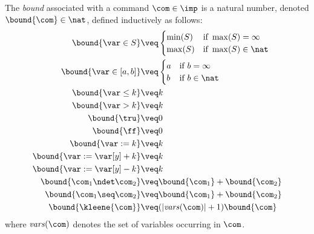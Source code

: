 \begin{definition}
  \label{de:bound}
  The \emph{bound} associated with a command \(\com\in \imp\) is a
  natural number, denoted \(\bound{\com}\in \nat\), defined
  inductively as follows:
  \begin{align*}
    \bound{\var \in S}  
    & \veq \begin{cases}
      \min(S) & \text{if } \max(S)=\infty\\
      \max(S) & \text{if } \max(S)\in \nat
    \end{cases}
    \\
    \bound{\var \in [a,b]}  
    & \veq \begin{cases}
      a & \text{if } b=\infty\\
      b & \text{if } b\in \nat
    \end{cases}
    \\
    \bound{\var \leq k}  
    & \veq k\\
    \bound{\var > k} 
    & \veq k\\
    \bound{\tru} 
    & \veq 0\\
    \bound{\ff} 
    & \veq 0\\
    \bound{\var := k} 
    & \veq k\\
    \bound{\var := \var[y] + k}
    & \veq k\\
    \bound{\var := \var[y] - k}
    & \veq k\\
    \bound{\com_1 \ndet \com_2}
    & \veq \bound{\com_1} + \bound{\com_2}\\
    \bound{\com_1 \seq \com_2}
    & \veq \bound{\com_1} + \bound{\com_2}\\
    \bound{\kleene{\com}}
    & \veq (|\mathit{vars}(\com)|+1) \bound{\com} \\ 
  \end{align*}
  where \(\mathit{vars}(\com)\) denotes the set of variables occurring in 
  \(\com\).
\end{definition}

